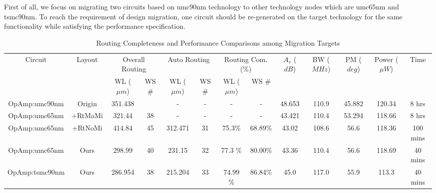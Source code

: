       First of all, we focus on migrating two circuits based on umc90nm technology to other technology nodes which are umc65nm and tsmc90nm. To reach the requirement of design migration, one circuit should be re-generated on the target technology for the same functionality while satisfying the performance specification. 

      
      
      \begin{table}
        \hspace{-1em}
        \begin{threeparttable}
        \scriptsize
        \begin{center}
          \caption{Routing Completeness and Performance Comparisons among Migration Targets}\label{table:MigrationPerf}
        \begin{tabular}{|c|c|c|c|c|c|c|c|c|c|c|c|c|}
          \toprule  
          \hline
            \multirow{2}{*}{Circuit}& 
            \multirow{2}{*}{Layout} & 
            \multicolumn{2}{c|}{Overall Routing \tnote{a}} & 
            \multicolumn{2}{c|}{Auto Routing \tnote{b}} & 
            \multicolumn{2}{c|}{Routing Com.\tnote{c} (\%)} & 
            \multirow{2}{1cm}{$A_v$ ($dB$)} & 
            \multirow{2}{1cm}{BW ($MHz$)} & 
            \multirow{2}{1cm}{PM ($deg$)} & 
            \multirow{2}{1cm}{Power ($\mu W$)}  &
            \multirow{2}{*}{Time }\\
            \cline{3-8} 
            & & WL ($\mu m$) & WS \# &  WL ($\mu m$) & WS \#  &  WL ($\mu m$) & WS \# & & & & & \\
          \hline
          OpAmp:umc90nm &  Origin & 351.438 & & - &-  &-& - & 48.653 &  110.9 & 45.882  & 120.34 &  8 hrs \\
          \hline
          OpAmp:umc65nm &  \cite{msc-bhattacharya-tcad06}+RtMaMi &  321.44 & 38 & - & - & - & - & 43.421& 110.4 &53.294 & 118.66 &  8 hrs \\
          \hline
          OpAmp:umc65nm & \cite{msc-bhattacharya-tcad06}+RtNoMi& 414.84 & 45 & 312.471 & 31 & 75.3\% & 68.89\%& 43.02& 108.6& 56.6& 118.36 &  100 mins \\
          \hline
          OpAmp:umc65nm &  Ours & 298.99& 40 & 231.15 &32 &  77.3 \%& 80.00\% & 43.36 & 110.4 & 56.6 & 118.69 & 40 mins \\
          \hline
          OpAmp:tsmc90nm  &  Ours & 286.954& 38 &  215.204& 33&  74.99 \% & 86.84\%& 45.0 &117.0 &55.9 & 113.3 & 40 mins \\
          \hline

\end{tabular}
\end{center}
\end{threeparttable}
\end{table}
